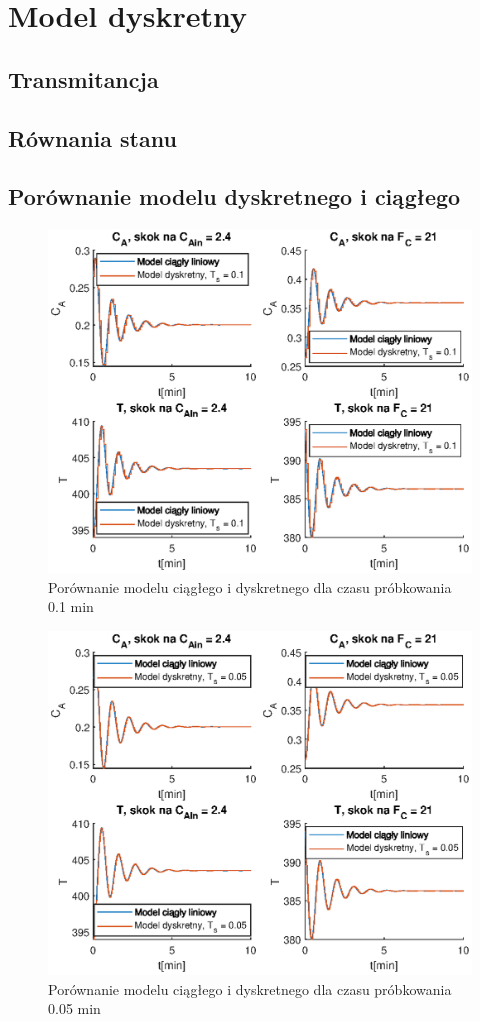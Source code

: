 \chapter{Model dyskretny}
\section{Transmitancja}
\section{Równania stanu}
\section{Porównanie modelu dyskretnego i ciągłego}
\begin{figure}
	\centering
	\includegraphics[width=.8\linewidth]{plot/dysk_1.eps}
	\caption{Porównanie modelu ciągłego i dyskretnego dla czasu próbkowania 0.1 min}
	\label{fig:dys01}
\end{figure}
\begin{figure}
\centering
\includegraphics[width=.8\linewidth]{plot/dysk_05.eps}
\caption{Porównanie modelu ciągłego i dyskretnego dla czasu próbkowania 0.05 min}
\label{fig:dys005}
\end{figure}
